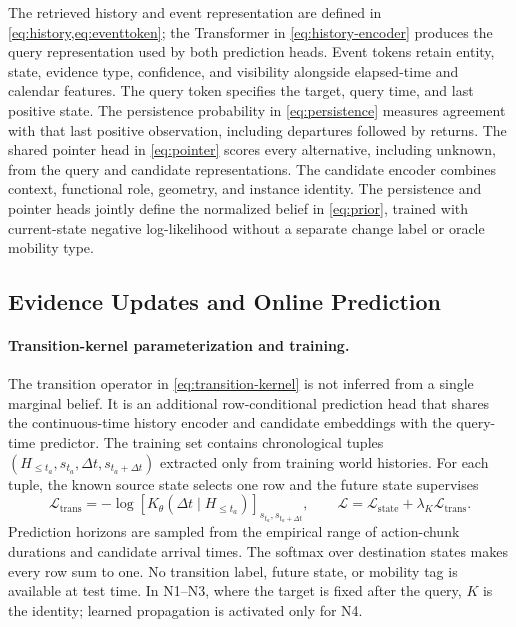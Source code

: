 The retrieved history and event representation are defined in
\cref{eq:history,eq:eventtoken}; the Transformer in \cref{eq:history-encoder}
produces the query representation used by both prediction heads. Event tokens
retain entity, state, evidence type, confidence, and visibility alongside
elapsed-time and calendar features. The query token specifies the target,
query time, and last positive state. The persistence probability in
\cref{eq:persistence} measures agreement with that last positive observation,
including departures followed by returns.
The shared pointer head in \cref{eq:pointer} scores every alternative,
including $\mathrm{unknown}$, from the query and candidate representations.
The candidate encoder combines context, functional role, geometry, and instance
identity. The persistence and pointer heads jointly define the normalized
belief in \cref{eq:prior}, trained with current-state negative log-likelihood
without a separate change label or oracle mobility type.

\subsection{Evidence Updates and Online Prediction}
\label{app:belief-control}

\paragraph{Transition-kernel parameterization and training.}
The transition operator in \cref{eq:transition-kernel} is not inferred from a
single marginal belief. It is an additional row-conditional prediction head
that shares the continuous-time history encoder and candidate embeddings with
the query-time predictor. The training set contains chronological tuples
$(H_{\leq t_a},s_{t_a},\Delta t,s_{t_a+\Delta t})$ extracted only from training
world histories. For each tuple, the known source state selects one row and the
future state supervises
\begin{equation}
\mathcal L_{\mathrm{trans}}=-\log
[K_\theta(\Delta t\mid H_{\leq t_a})]_{s_{t_a},s_{t_a+\Delta t}},\qquad
\mathcal L=\mathcal L_{\mathrm{state}}+\lambda_K\mathcal L_{\mathrm{trans}}.
\label{eq:transition-loss}
\end{equation}
Prediction horizons are sampled from the empirical range of action-chunk durations
and candidate arrival times. The softmax over destination states makes every row sum to one. No
transition label, future state, or mobility tag is available at test time. In
N1--N3, where the target is fixed after the query, $K$ is the identity; learned
propagation is activated only for N4.

